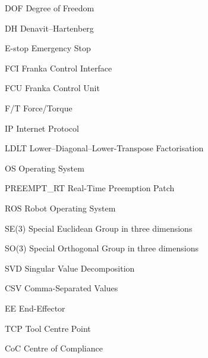 
\makeatletter

\newcommand{\DeclareThesisAcronym}[3]{%
  \expandafter\gdef\csname thesisacro@short@#1\endcsname{#2}%
  \expandafter\gdef\csname thesisacro@long@#1\endcsname{#3}%
}

\DeclareRobustCommand{\ThesisAcronymUsed}[1]{%
  \expandafter\gdef\csname thesisacro@used@#1\endcsname{}%
}

\DeclareRobustCommand{\UseThesisAcronym}[1]{%
  \if@filesw
    \begingroup
    \protected@write\@auxout{}{\string\ThesisAcronymUsed{#1}}%
    \endgroup
  \fi
}

\DeclareRobustCommand{\abbr}[1]{%
  \UseThesisAcronym{#1}%
  \@ifundefined{thesisacro@short@#1}{#1}{\csname thesisacro@short@#1\endcsname}%
}

\newcommand{\PrintThesisAcronym}[1]{%
  \csname thesisacro@short@#1\endcsname
  & \csname thesisacro@long@#1\endcsname \\%
}

\DeclareThesisAcronym{DOF}{DOF}{Degree of Freedom}
\DeclareThesisAcronym{DH}{DH}{Denavit--Hartenberg}
\DeclareThesisAcronym{ESTOP}{E-stop}{Emergency Stop}
\DeclareThesisAcronym{FCI}{FCI}{Franka Control Interface}
\DeclareThesisAcronym{FCU}{FCU}{Franka Control Unit}
\DeclareThesisAcronym{FT}{F/T}{Force/Torque}
\DeclareThesisAcronym{IP}{IP}{Internet Protocol}
\DeclareThesisAcronym{LDLT}{LDLT}{Lower--Diagonal--Lower-Transpose Factorisation}
\DeclareThesisAcronym{OS}{OS}{Operating System}
\DeclareThesisAcronym{PREEMPTRT}{PREEMPT\_RT}{Real-Time Preemption Patch}
\DeclareThesisAcronym{ROS}{ROS}{Robot Operating System}
\DeclareThesisAcronym{SE3}{SE(3)}{Special Euclidean Group in three dimensions}
\DeclareThesisAcronym{SO3}{SO(3)}{Special Orthogonal Group in three dimensions}
\DeclareThesisAcronym{SVD}{SVD}{Singular Value Decomposition}
\DeclareThesisAcronym{CSV}{CSV}{Comma-Separated Values}
\DeclareThesisAcronym{EE}{EE}{End-Effector}
\DeclareThesisAcronym{TCP}{TCP}{Tool Centre Point}
\DeclareThesisAcronym{CoC}{CoC}{Centre of Compliance}

\makeatother
